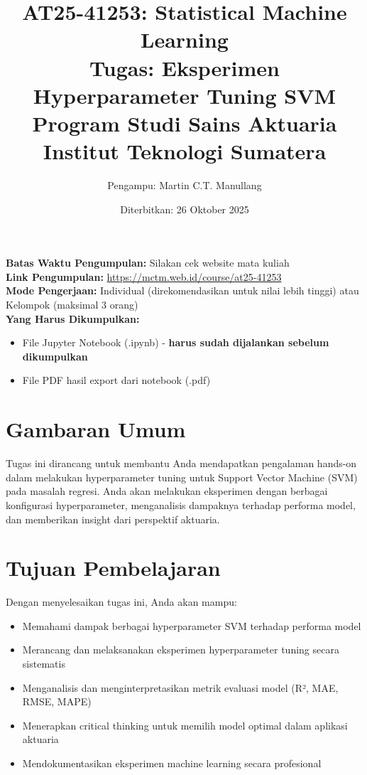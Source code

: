 \documentclass[12pt,a4paper]{article}
\title{
    \textbf{AT25-41253: Statistical Machine Learning} \\
    \Large{Tugas: Eksperimen Hyperparameter Tuning SVM} \\
    \vspace{0.5cm}
    \normalsize{Program Studi Sains Aktuaria} \\
    \normalsize{Institut Teknologi Sumatera}
}
\author{Pengampu: Martin C.T. Manullang}
\date{Diterbitkan: 26 Oktober 2025}
\begin{document}
\maketitle

\begin{tcolorbox}[colback=blue!5!white,colframe=blue!75!black,title=Informasi Penting]
\textbf{Batas Waktu Pengumpulan:} Silakan cek website mata kuliah \\
\textbf{Link Pengumpulan:} \url{https://mctm.web.id/course/at25-41253} \\
\textbf{Mode Pengerjaan:} Individual (direkomendasikan untuk nilai lebih tinggi) atau Kelompok (maksimal 3 orang) \\
\textbf{Yang Harus Dikumpulkan:} 
\begin{itemize}
    \item File Jupyter Notebook (.ipynb) - \textbf{harus sudah dijalankan sebelum dikumpulkan}
    \item File PDF hasil export dari notebook (.pdf)
\end{itemize}
\end{tcolorbox}

\section{Gambaran Umum}

Tugas ini dirancang untuk membantu Anda mendapatkan pengalaman hands-on dalam melakukan hyperparameter tuning untuk Support Vector Machine (SVM) pada masalah regresi. Anda akan melakukan eksperimen dengan berbagai konfigurasi hyperparameter, menganalisis dampaknya terhadap performa model, dan memberikan insight dari perspektif aktuaria.

\section{Tujuan Pembelajaran}

Dengan menyelesaikan tugas ini, Anda akan mampu:
\begin{itemize}
    \item Memahami dampak berbagai hyperparameter SVM terhadap performa model
    \item Merancang dan melaksanakan eksperimen hyperparameter tuning secara sistematis
    \item Menganalisis dan menginterpretasikan metrik evaluasi model (R², MAE, RMSE, MAPE)
    \item Menerapkan critical thinking untuk memilih model optimal dalam aplikasi aktuaria
    \item Mendokumentasikan eksperimen machine learning secara profesional
\end{itemize}
\end{document}
